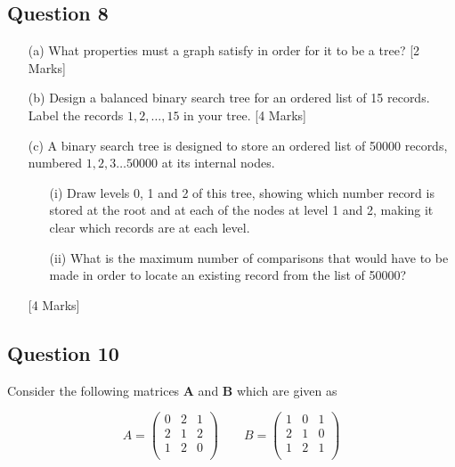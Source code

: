 \documentclass[a4paper,12pt]{article}
\begin{document}
\subsection*{Question 8}
\begin{itemize}

\item[(a)] What properties must a graph satisfy in order for it to be a tree? [2 Marks]
\item[(b)] Design a balanced binary search tree for an ordered list of 15 records.
Label the records $1,2, \ldots , 15$ in your tree. [4 Marks]

\item[(c)] A binary search tree is designed to store an ordered list of 50000 records,
numbered $1,2,3\ldots 50000$ at its internal nodes.
\begin{itemize}
\item[(i)] Draw levels 0, 1 and 2 of this tree, showing which number record is stored
at the root and at each of the nodes at level 1 and 2, making it clear
which records are at each level.
\item[(ii)] What is the maximum number of comparisons that would have to be
made in order to locate an existing record from the list of 50000? 
\end{itemize}
[4 Marks]
\end{itemize}


\subsection*{Question 10}
Consider the following matrices \textbf{A} and \textbf{B} which are given as


\[ A = \left(
  \begin{array}{ccc}
0 & 2 & 1 \\
2 &1 &2\\
1 &2 &0\\
  \end{array}
\right) \qquad
B = \left(
\begin{array}{ccc}
1 &0 &1\\
2 &1 &0\\
1 &2 &1\\
\end{array}
\right)
\]
\end{document}
